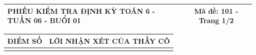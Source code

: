 \documentclass[12pt,a4paper]{article}
\begin{document}
\pagestyle{empty}

\noindent
\begin{tabularx}{\linewidth}{|X|c|}
\hline
\textbf{PHIẾU KIỂM TRA ĐỊNH KỲ TOÁN 6 - TUẦN 06 - BUỔI 01} & \textbf{Mã đề: 101 - Trang 1/2} \\
\hline
\end{tabularx}

\vspace{1mm}

\noindent
\begin{tabularx}{\linewidth}{|p{3.2cm}|X|}
\hline
\centering\textbf{ĐIỂM SỐ} & \centering\textbf{LỜI NHẬN XÉT CỦA THẦY CÔ} \tabularnewline
\hline
\rule{0pt}{1.8cm} & \tabularnewline
\hline
\end{tabularx}

\vspace{1.2mm}
\end{document}
